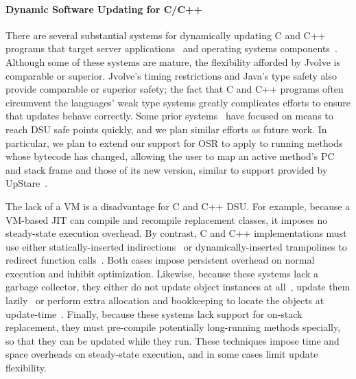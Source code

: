\documentclass[9pt]{sigplanconf}
\newcommand{\DSU}{{\sc Jvolve}}
\begin{document}
% 

\paragraph{Dynamic Software Updating for C/C++}

There are several substantial systems for dynamically updating C and
C++ programs that target server
applications~\cite{HjalmtyssonG98,altekar05opus,neamtiu06dsu,chen:icse07,upstare,neamtiu09stump}
and operating systems
components~\cite{K42reconfig,k42usenix,chen06vee,lee06linuxmod,dynamos_eurosys_07}.
Although some of these systems are mature, the flexibility
afforded by \DSU{} is comparable or superior.  \DSU's timing
restrictions and Java's type safety also provide comparable or
superior safety; the fact that C and C++ programs often circumvent the
languages' weak type systems greatly complicates efforts 
to ensure that updates behave correctly.  Some prior
systems~\cite{neamtiu09stump,upstare,chen:icse07} have focused 
on means to reach DSU safe points quickly, and we plan similar
efforts as future work.  In particular, we plan to extend our support
for OSR to apply to running methods whose bytecode has changed,
allowing the user to map an active method's PC and
stack frame and those of its new version, similar to support provided by
UpStare~\cite{upstare}.

The lack of a VM is a disadvantage for C and C++ DSU.  For
example, because a VM-based JIT can compile and recompile replacement
classes, it imposes no steady-state execution overhead.  By contrast,
C and C++ implementations must use either statically-inserted
indirections~\cite{HjalmtyssonG98,neamtiu06dsu,K42reconfig,k42usenix,upstare}
or dynamically-inserted trampolines to redirect function
calls~\cite{altekar05opus,chen06vee,chen:icse07,ksplice}.  Both cases
impose persistent overhead on normal execution and inhibit
optimization.  Likewise, because these systems lack a garbage
collector, they either do not update object instances at
all~\cite{ksplice}, update them lazily~\cite{neamtiu06dsu,chen:icse07}
or perform extra allocation and bookkeeping to locate the
objects at update-time~\cite{k42usenix}.  Finally, because these
systems lack support for on-stack replacement, they must pre-compile
potentially long-running methods specially, so that they can be
updated while they run.   These techniques impose time and space overheads on
steady-state execution, and in some cases limit update flexibility.
\end{document}
